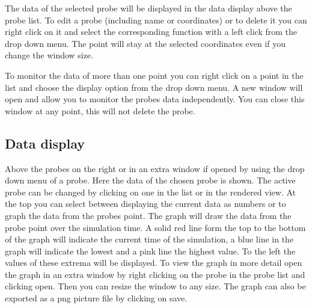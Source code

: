 \documentclass[paper=a4]{proc}
\begin{document}
		The data of the selected probe will be displayed in the data display above the probe list. To edit a probe (including name or coordinates) or to delete it you can right click on it and select the corresponding function with a left click from the drop down menu. The point will stay at the selected coordinates even if you change the window size. 
		
		To monitor the data of more than one point you can right click on a point in the list and choose the display option from the drop down menu. A new window will open and allow you to monitor the probes data independently. You can close this window at any point, this will not delete the probe.
		\subsection{Data display}
		Above the probes on the right or in an extra window if opened by using the drop down menu of a probe. Here the data of the chosen probe is shown. The active probe can be changed by clicking on one in the list or in the rendered view. At the top you can select between displaying the current data as numbers or to graph the data from the probes point. The graph will draw the data from the probe point over the simulation time. A solid red line form the top to the bottom of the graph will indicate the current time of the simulation, a blue line in the graph will indicate the lowest and a pink line the highest value. To the left the values of these extrema will be displayed. To view the graph in more detail open the graph in an extra window by right clicking on the probe in the probe list and clicking open. Then you can resize the window to any size. The graph can also be exported as a png picture file by clicking on save.
\end{document}
